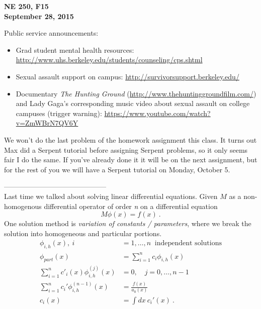 \documentclass[12pt]{article}
\begin{document}
\begin{center}
{\bf NE 250, F15\\
September 28, 2015 
}
\end{center}

Public service announcements: 
\begin{itemize}
\item Grad student mental health resources: \href{http://www.uhs.berkeley.edu/students/counseling/cps.shtml}{http://www.uhs.berkeley.edu/students/counseling/cps.shtml}
\item Sexual assault support on campus: \href{http://survivorsupport.berkeley.edu/}{http://survivorsupport.berkeley.edu/}
\item Documentary \textit{The Hunting Ground} (\href{http://www.thehuntinggroundfilm.com/}{http://www.thehuntinggroundfilm.com/}) and Lady Gaga's corresponding music video about sexual assault on college campuses (trigger warning): \href{https://www.youtube.com/watch?v=ZmWBrN7QV6Y}{https://www.youtube.com/watch?v=ZmWBrN7QV6Y}
\end{itemize}

We won't do the last problem of the homework assignment this class. It turns out Max did a Serpent tutorial before assigning Serpent problems, so it only seems fair I do the same. If you've already done it it will be on the next assignment, but for the rest of you we will have a Serpent tutorial on Monday, October 5.

--------------------------------------------\\
Last time we talked about solving linear differential equations. 
Given $M$ as a non-homogenous differential operator of order \emph{n} on a differential equation
%
\begin{equation*}
M\phi(x) = f(x) \:.
\end{equation*}
%
One solution method is \textit{variation of constants / parameters}, where we break the solution into homogeneous and particular portions.
\begin{align*}
\phi_{i,h}(x),  \:i &= 1,\dotsc, n \:\text{ independent solutions} \\
\phi_{part}(x) &= \sum_{i=1}^n c_i\phi_{i,h}(x)\\
\sum_{i=1}^n c'_i(x) \phi^{(j)}_{i,h}(x) &= 0, \quad j = 0, \dots, n-1 \\
\sum_{i=1}^n c_i'\phi^{(n-1)}_{i,h}(x) &= \frac{f(x)}{a_0(x)} \\
c_i(x)& = \int dx\:c_i'(x) \:.
\end{align*}
\end{document}

